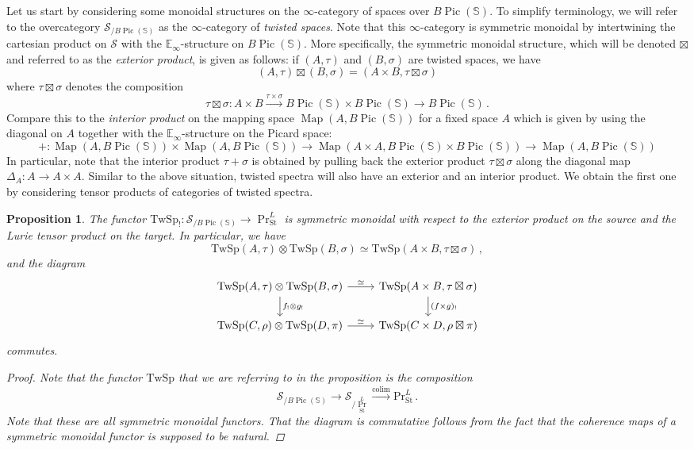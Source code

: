 \documentclass[10pt]{amsart}
\newcommand{\longto}{\longrightarrow}
\theoremstyle{plain}
\newtheorem{proposition}[theorem]{Proposition}
\theoremstyle{definition}
\DeclareMathOperator*{\colim}{colim}
\DeclareMathOperator{\Pic}{Pic}
\DeclareMathOperator{\Map}{Map}
\newcommand{\St}{\mathrm{St}}
\newcommand{\bE}{\mathbb{E}}
\newcommand{\bS}{\mathbb{S}}
\newcommand{\TwSp}{\mathrm{TwSp}}
\newcommand{\cS}{\mathcal{S}}
\begin{document}
Let us start by considering some monoidal structures on the $\infty$-category of spaces over $B\Pic(\bS)$.
To simplify terminology, we will refer to the overcategory $\cS_{/B\Pic(\bS)}$ as the $\infty$-category of \emph{twisted spaces}.
Note that this $\infty$-category is symmetric monoidal by intertwining the cartesian product on $\cS$ with the $\bE_\infty$-structure on $B\Pic(\bS)$.
More specifically, the symmetric monoidal structure, which will be denoted $\boxtimes$ and referred to as the \emph{exterior product}, is given as follows: if $(A,\tau)$ and $(B,\sigma)$ are twisted spaces, we have
\[
(A, \tau) \boxtimes (B,\sigma) = (A \times B , \tau \boxtimes \sigma)
\]
where $\tau \boxtimes \sigma$ denotes the composition
\[
\tau \boxtimes \sigma : A \times B \overset{\tau \times \sigma}\longto B\Pic(\bS) \times B\Pic(\bS) \longto B\Pic(\bS) \,.
\]
Compare this to the \emph{interior product} on the mapping space $\Map(A,B\Pic(\bS))$ for a fixed space $A$ which is given by using the diagonal on $A$ together with the $\bE_\infty$-structure on the Picard space:
\[
 +  : \Map(A,B\Pic(\bS)) \times \Map(A,B\Pic(\bS)) \longto \Map(A \times A, B\Pic(\bS) \times B\Pic(\bS)) \longto \Map(A,B\Pic(\bS))
\]
In particular, note that the interior product $\tau + \sigma$ is obtained by pulling back the exterior product $\tau \boxtimes \sigma$ along the diagonal map $\Delta_A : A \to A \times A$.
Similar to the above situation, twisted spectra will also have an exterior and an interior product.
We obtain the first one by considering tensor products of categories of twisted spectra.

\begin{proposition}\label{prop:tensor_twisted_categories}
  The functor $\TwSp_! : \cS_{/B\Pic(\bS)} \to \Pr^{L}_{\St}$ is symmetric monoidal with respect to the exterior product on the source and the Lurie tensor product on the target.
  In particular, we have
  \[
  \TwSp(A,\tau) \otimes \TwSp(B,\sigma) \simeq \TwSp(A \times B , \tau \boxtimes \sigma) \,,
  \]
  and the diagram
  \[
  \begin{tikzcd}
    \TwSp(A, \tau) \otimes \TwSp(B,\sigma) \arrow[d,"f_! \otimes g_!"] \arrow[r,"\simeq"] & \TwSp(A \times B, \tau \boxtimes \sigma) \arrow[d,"(f \times g)_!"] \\
    \TwSp(C,\rho) \otimes \TwSp(D,\pi) \arrow[r,"\simeq"] & \TwSp(C \times D , \rho \boxtimes \pi)
  \end{tikzcd}
  \]
  commutes.
  \begin{proof}
    Note that the functor $\TwSp$ that we are referring to in the proposition is the composition
    \[
    \cS_{/B\Pic(\bS)} \longto \cS_{/\Pr^{L}_{\St}} \overset{\colim}\longto \mathrm{Pr}^{L}_{\St} \,.
    \]
    Note that these are all symmetric monoidal functors.
    That the diagram is commutative follows from the fact that the coherence maps of a symmetric monoidal functor is supposed to be natural.
  \end{proof}
\end{proposition}
\end{document}
